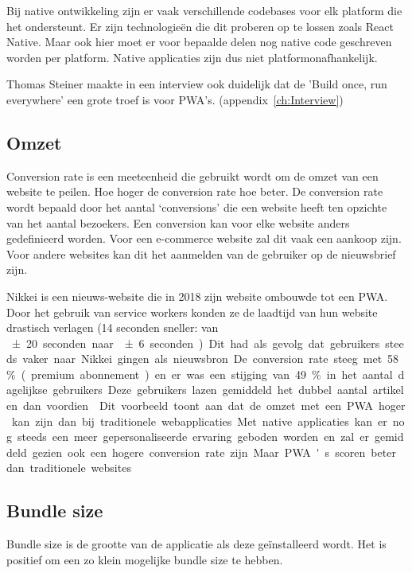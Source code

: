 	Bij native ontwikkeling zijn er vaak verschillende codebases voor elk platform die het ondersteunt. Er zijn technologieën die dit proberen op te lossen zoals React Native. Maar ook hier moet er voor bepaalde delen nog native code geschreven worden per platform. Native applicaties zijn dus niet platformonafhankelijk. 
	
	Thomas Steiner maakte in een interview ook duidelijk dat de 'Build once, run everywhere' een grote troef is voor PWA's.
	(appendix~\ref{ch:Interview})

\subsection{Omzet}
	Conversion rate is een meeteenheid die gebruikt wordt om de omzet van een website te peilen. Hoe hoger de conversion rate hoe beter. De conversion rate wordt bepaald door het aantal ‘conversions’ die een website heeft ten opzichte van het aantal bezoekers. Een conversion kan voor elke website anders gedefinieerd worden. Voor een e-commerce website zal dit vaak een aankoop zijn. Voor andere websites kan dit het aanmelden van de gebruiker op de nieuwsbrief zijn.
	\autocite{GoogleSupport2020}
	
	Nikkei is een nieuws-website die in 2018 zijn website ombouwde tot een PWA.  Door het gebruik van service workers konden ze de laadtijd van hun website drastisch verlagen (14 seconden sneller:  van \SI{\pm 20} seconden naar  \SI{\pm 6} seconden). Dit had als gevolg dat gebruikers steeds vaker naar Nikkei gingen als nieuwsbron. 
	
	De conversion rate steeg met 58\% (premium abonnement) en er was een stijging van 49\% in het aantal dagelijkse gebruikers. Deze gebruikers lazen gemiddeld het dubbel aantal artikelen dan voordien. 
	\autocite{Developers2018}
	
	Dit voorbeeld toont aan dat de omzet met een PWA hoger kan zijn dan bij traditionele webapplicaties.
	
	Met native applicaties kan er nog steeds een meer gepersonaliseerde ervaring geboden worden en zal er gemiddeld gezien ook een hogere conversion rate zijn. Maar PWA's scoren beter dan traditionele websites.
	\autocite{Anastasia2019}
	

\subsection{Bundle size}
\begin{center}

\end{center}
	Bundle size is de grootte van de applicatie als deze geïnstalleerd wordt. Het is positief om een zo klein mogelijke bundle size te hebben. \autocite{Scott2019}
	
